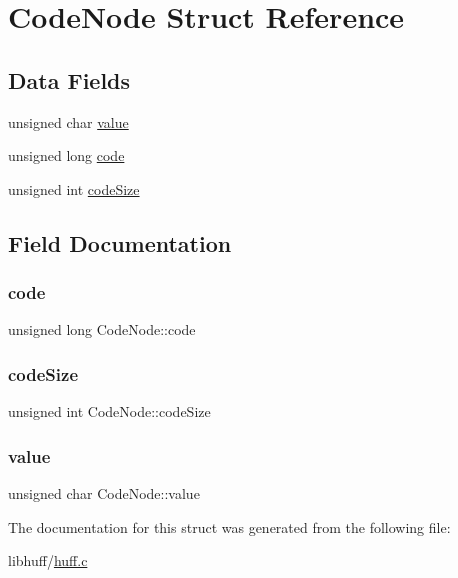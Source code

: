 \hypertarget{structCodeNode}{}\section{Code\+Node Struct Reference}
\label{structCodeNode}
\subsection*{Data Fields}
\begin{DoxyCompactItemize}
\item 
unsigned char \hyperlink{structCodeNode_aa1a1455e17cd12a923cca88b040f791e}{value}
\item 
unsigned long \hyperlink{structCodeNode_a919b38ecdf1e9b61392803a10a050910}{code}
\item 
unsigned int \hyperlink{structCodeNode_aa41fc504697d8b80caa24872b9d91e94}{code\+Size}
\end{DoxyCompactItemize}


\subsection{Field Documentation}
\mbox{\label{structCodeNode_a919b38ecdf1e9b61392803a10a050910}} 
\subsubsection{\texorpdfstring{code}{code}}
{\footnotesize\ttfamily unsigned long Code\+Node\+::code}

\mbox{\label{structCodeNode_aa41fc504697d8b80caa24872b9d91e94}} 
\subsubsection{\texorpdfstring{code\+Size}{codeSize}}
{\footnotesize\ttfamily unsigned int Code\+Node\+::code\+Size}

\mbox{\label{structCodeNode_aa1a1455e17cd12a923cca88b040f791e}} 
\subsubsection{\texorpdfstring{value}{value}}
{\footnotesize\ttfamily unsigned char Code\+Node\+::value}



The documentation for this struct was generated from the following file\+:\begin{DoxyCompactItemize}
\item 
libhuff/\hyperlink{huff_8c}{huff.\+c}\end{DoxyCompactItemize}
